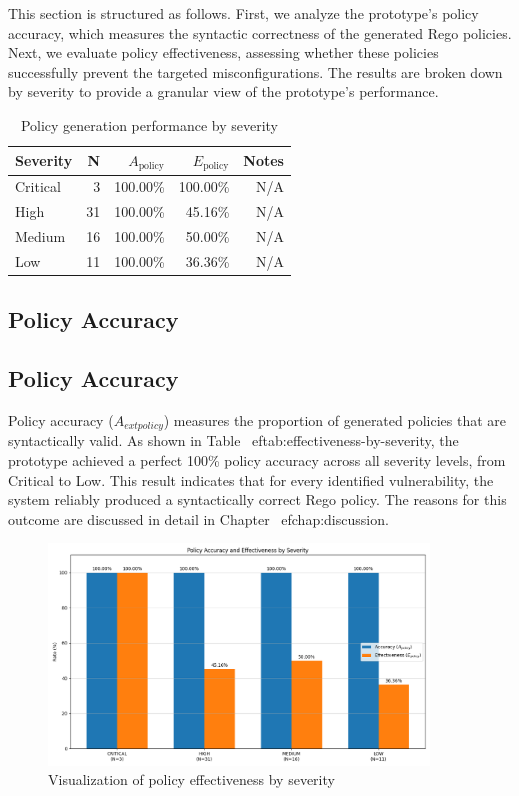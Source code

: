 This section is structured as follows. First, we analyze the prototype's policy accuracy, which measures the syntactic correctness of the generated Rego policies. Next, we evaluate policy effectiveness, assessing whether these policies successfully prevent the targeted misconfigurations. The results are broken down by severity to provide a granular view of the prototype's performance.

\begin{table}[htbp]
	\centering
		\caption{Policy generation performance by severity}\label{tab:effectiveness-by-severity}
	\begin{tabular}{lrrrr}
		\hline
		Severity & N & $A_{\text{policy}}$ & $E_{\text{policy}}$ & Notes \\
		\hline
		Critical & 3 & 100.00\% & 100.00\% & N/A \\
		High & 31 & 100.00\% & 45.16\% & N/A \\
		Medium & 16 & 100.00\% & 50.00\% & N/A \\
		Low & 11 & 100.00\% & 36.36\% & N/A \\
		\hline
	\end{tabular}
\end{table}

\subsection{Policy Accuracy}
\subsection{Policy Accuracy}
Policy accuracy ($A_{	ext{policy}}$) measures the proportion of generated policies that are syntactically valid. As shown in Table~
ef{tab:effectiveness-by-severity}, the prototype achieved a perfect 100\% policy accuracy across all severity levels, from Critical to Low. This result indicates that for every identified vulnerability, the system reliably produced a syntactically correct Rego policy. The reasons for this outcome are discussed in detail in Chapter~
ef{chap:discussion}.

\begin{figure}[htbp]
	\centering
	\includegraphics[width=0.9\textwidth]{Figures/effectiveness_by_severity.png}
	\caption{Visualization of policy effectiveness by severity}\label{fig:effectiveness-plot}
\end{figure}

